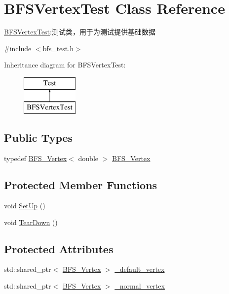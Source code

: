 \hypertarget{class_b_f_s_vertex_test}{}\section{B\+F\+S\+Vertex\+Test Class Reference}
\label{class_b_f_s_vertex_test}


\hyperlink{class_b_f_s_vertex_test}{B\+F\+S\+Vertex\+Test}\+:测试类，用于为测试提供基础数据  




{\ttfamily \#include $<$bfs\+\_\+test.\+h$>$}

Inheritance diagram for B\+F\+S\+Vertex\+Test\+:\begin{figure}[H]
\begin{center}
\leavevmode
\includegraphics[height=2.000000cm]{class_b_f_s_vertex_test}
\end{center}
\end{figure}
\subsection*{Public Types}
\begin{DoxyCompactItemize}
\item 
typedef \hyperlink{class_b_f_s_vertex_test_a9ff4e5b50fe6468b08ee5e04f0527d7c}{B\+F\+S\+\_\+\+Vertex}$<$ double $>$ \hyperlink{class_b_f_s_vertex_test_a9ff4e5b50fe6468b08ee5e04f0527d7c}{B\+F\+S\+\_\+\+Vertex}
\end{DoxyCompactItemize}
\subsection*{Protected Member Functions}
\begin{DoxyCompactItemize}
\item 
void \hyperlink{class_b_f_s_vertex_test_a3f6d438f93bb897fc216d30a49718ce3}{Set\+Up} ()
\item 
void \hyperlink{class_b_f_s_vertex_test_a199a64fd9255e1f6908bb37da0fce740}{Tear\+Down} ()
\end{DoxyCompactItemize}
\subsection*{Protected Attributes}
\begin{DoxyCompactItemize}
\item 
std\+::shared\+\_\+ptr$<$ \hyperlink{class_b_f_s_vertex_test_a9ff4e5b50fe6468b08ee5e04f0527d7c}{B\+F\+S\+\_\+\+Vertex} $>$ \hyperlink{class_b_f_s_vertex_test_ab78f6c9cb070fe5a8992f61cc5f71920}{\+\_\+default\+\_\+vertex}
\item 
std\+::shared\+\_\+ptr$<$ \hyperlink{class_b_f_s_vertex_test_a9ff4e5b50fe6468b08ee5e04f0527d7c}{B\+F\+S\+\_\+\+Vertex} $>$ \hyperlink{class_b_f_s_vertex_test_aedd37204d4a3723bd78fa72af7caa6e0}{\+\_\+normal\+\_\+vertex}
\end{DoxyCompactItemize}


